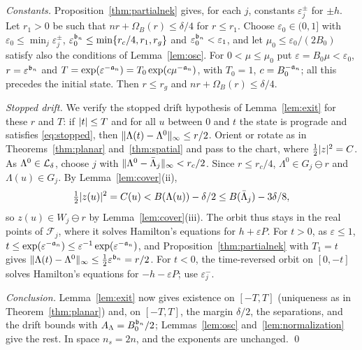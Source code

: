 \emph{Constants.} Proposition~\ref{thm:partialnek} gives, for each $j$, constants $\varepsilon_j^\pm$ for $\pm h$.
Let $r_1>0$ be such that $nr+\Omega_B(r)\le\delta/4$ for $r\le r_1$. Choose $\varepsilon_0\in(0,1]$ with
$\varepsilon_0\le\min_j\varepsilon_j^\pm$, $\varepsilon_0^{\mathfrak{b}_n{}}\le\min\{r_c/4,r_1,r_g\}$ and
$\varepsilon_0^{\mathfrak{b}_n{}}<\varepsilon_1$, and let $\mu_0\le\varepsilon_0/(2B_0)$ satisfy also the conditions of
Lemma~\ref{lem:osc}. For $0<\mu\le\mu_0$ put $\varepsilon=B_0\mu<\varepsilon_0$, $r=\varepsilon^{\mathfrak{b}_n{}}$ and
$T=\exp(\varepsilon^{-\mathfrak{a}_n{}})=T_0\exp(c\mu^{-\mathfrak{a}_n{}})$, with $T_0=1$, $c=B_0^{-\mathfrak{a}_n{}}$; all this precedes the
initial state. Then $r\le r_g$ and $nr+\Omega_B(r)\le\delta/4$.

\emph{Stopped drift.} We verify the stopped drift hypothesis of Lemma~\ref{lem:exit} for these $r$ and $T$: if
$\lvert t\rvert\le T$ and for all $u$ between $0$ and $t$ the state is prograde and satisfies \eqref{eq:stopped}, then
$\lVert \Lambda(t)-\Lambda^0\rVert_\infty\le r/2$. Orient or rotate as in Theorems~\ref{thm:planar} and~\ref{thm:spatial} and
pass to the chart, where $\frac12\lvert z\rvert^2=C$. As $\Lambda^0\in\mathcal{L}_\delta$, choose $j$ with
$\lVert \Lambda^0-\bar\Lambda_j\rVert_\infty<r_c/2$. Since $r\le r_c/4$, $\Lambda^0\in G_j\ominus r$ and $\Lambda(u)\in G_j$. By
Lemma~\ref{lem:cover}(ii),
\[
  \tfrac12\lvert z(u)\rvert^2=C(u)<B(\Lambda(u))-\delta/2\le B(\bar\Lambda_j)-3\delta/8,
\]
so $z(u)\in W_j\ominus r$ by Lemma~\ref{lem:cover}(iii). The orbit thus stays in the real points of
$\mathcal F_j$, where it solves Hamilton's equations for $h+\varepsilon P$. For $t>0$, as $\varepsilon\le1$,
$t\le\exp(\varepsilon^{-\mathfrak{a}_n{}})\le\varepsilon^{-1}\exp(\varepsilon^{-\mathfrak{a}_n{}})$, and Proposition~\ref{thm:partialnek}
with $T_1=t$ gives $\lVert \Lambda(t)-\Lambda^0\rVert_\infty\le\frac12\varepsilon^{\mathfrak{b}_n{}}=r/2$. For $t<0$, the time-reversed orbit
on $[0,-t]$ solves Hamilton's equations for $-h-\varepsilon P$; use $\varepsilon_j^-$.

\emph{Conclusion.} Lemma~\ref{lem:exit} now gives existence on $[-T,T]$ (uniqueness as in Theorem~\ref{thm:planar}) and, on $[-T,T]$, the margin $\delta/2$, the
separations, and the drift bounds with $A_\Lambda=B_0^{\mathfrak{b}_n{}}/2$; Lemmas~\ref{lem:osc}
and~\ref{lem:normalization} give the rest. In space $n_s=2n$, and the exponents are unchanged. \qed
